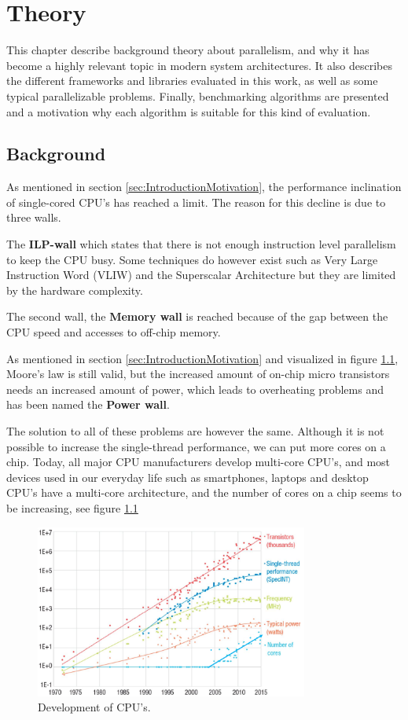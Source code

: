 
\chapter{Theory}
This chapter describe background theory about parallelism, and why it has become a highly relevant topic in modern system architectures. It also describes the different frameworks and libraries evaluated in this work, as well as some typical parallelizable problems. Finally, benchmarking algorithms are presented and a motivation why each algorithm is suitable for this kind of evaluation.

\section{Background} 
As mentioned in section \ref{sec:IntroductionMotivation}, the performance inclination of single-cored CPU's has reached a limit. The reason for this decline is due to three walls.

The \textbf{ILP-wall} which states that there is not enough instruction level parallelism to keep the CPU busy. Some techniques do however exist such as Very Large Instruction Word (VLIW) and the Superscalar Architecture but they are limited by the hardware complexity.

The second wall, the \textbf{Memory wall} is reached because of the gap between the CPU speed and accesses to off-chip memory.

As mentioned in section \ref{sec:IntroductionMotivation} and visualized in figure \ref{fig:CPUstats}, Moore's law is still valid, but the increased amount of on-chip micro transistors needs an increased amount of power, which leads to overheating problems and has been named the \textbf{Power wall}.

The solution to all of these problems are however the same. Although it is not possible to increase the single-thread performance, we can put more cores on a chip. Today, all major CPU manufacturers develop multi-core CPU's, and most devices used in our everyday life such as smartphones, laptops 
and desktop CPU's have a multi-core architecture, and the number of cores on a chip seems to be increasing, see figure \ref{fig:CPUstats}

\begin{figure}[!h]
    \centering
    \includegraphics[width=0.8\textwidth]{Introduction/Figs/CPUStats.png}
    \caption{Development of CPU's. \cite{CPUStats}}
    \label{fig:CPUstats}
\end{figure}


